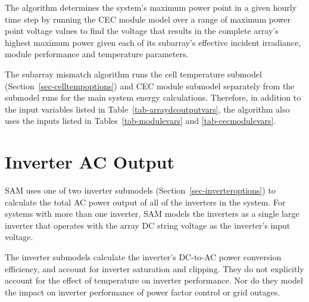 \documentclass[12pt,letterpaper]{article}
\begin{document}
The algorithm determines the system's maximum power point in a given hourly time step by running the CEC module model over a range of maximum power point voltage values to find the voltage that results in the complete array's highest maximum power given each of its subarray's effective incident irradiance, module performance and temperature parameters.

The subarray mismatch algorithm runs the cell temperature submodel (Section~\ref{sec-celltempoptions}) and CEC module submodel separately from the submodel runs for the main system energy calculations. Therefore, in addition to the input variables listed in Table~\ref{tab-arraydcoutputvars}, the algorithm also uses the inputs listed in Tables~\ref{tab-modulevars} and \ref{tab-cecmodulevars}.

\chapter{Inverter AC Output}\label{sec-inverter}

SAM uses one of two inverter submodels (Section~\ref{sec-inverteroptions}) to calculate the total AC power output of all of the inverters in the system. For systems with more than one inverter, SAM models the inverters as a single large inverter that operates with the array DC string voltage as the inverter's input voltage. 

The inverter submodels calculate the inverter's DC-to-AC power conversion efficiency, and account for inverter saturation and clipping. They do not explicitly account for the effect of temperature on inverter performance. Nor do they model the impact on inverter performance of power factor control or grid outages.
\end{document}
